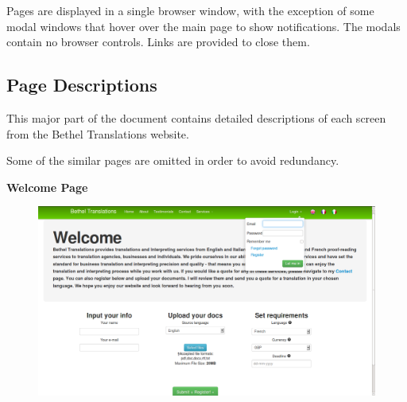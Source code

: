 \documentclass{l3proj}
\begin{document}
Pages are displayed in a single browser window, with the exception
of some modal windows that hover over the main page to show notifications. The modals
contain no browser controls. Links are provided to close them.

\subsection{Page Descriptions}

This major part of the document contains detailed descriptions of
each screen from the Bethel Translations website.

Some of the similar pages are omitted in order to avoid redundancy.

\textbf{Welcome Page}
\begin{figure}[H]
\centering
\includegraphics[width=0.8\linewidth]{images/welcomePage}
\vspace{-30pt}
\end{figure}
\end{document}
